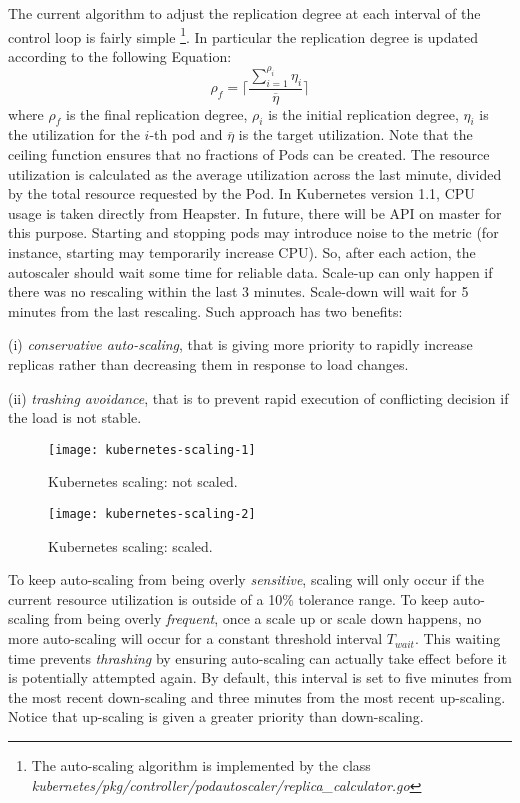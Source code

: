 The current algorithm to adjust the replication degree at each interval of the control loop is fairly simple
\footnote{The auto-scaling algorithm is implemented by the class \textit{kubernetes/pkg/controller/podautoscaler/replica\_calculator.go}}.
%
In particular the replication degree is updated according to the following Equation:
%
\begin{equation}
\label{eqn:kubernetes-auto-scaling}
\rho_{f} = \Biggl\lceil\frac{\sum_{i=1}^{\rho_{i}} \eta_{i}}{\overline{\eta}}\Biggr\rceil
\end{equation}
%
where
$\rho_{f}$ is the final replication degree,
$\rho_{i}$ is the initial replication degree,
$\eta_{i}$ is the utilization for the $i$-th pod and
$\overline{\eta}$ is the target utilization.
%
Note that the ceiling function ensures that no fractions of Pods can be created.
%
The resource utilization is calculated as the average utilization across the last minute, divided by the total resource requested by the Pod. 
%
In Kubernetes version 1.1, CPU usage is taken directly from Heapster. In future, there will be API on master for this purpose.
%
Starting and stopping pods may introduce noise to the metric (for instance, starting may temporarily increase CPU). So, after each action, the autoscaler should wait some time for reliable data. Scale-up can only happen if there was no rescaling within the last 3 minutes. Scale-down will wait for 5 minutes from the last rescaling.
%
Such approach has two benefits: 

(i) \textit{conservative auto-scaling}, that is giving more priority to rapidly increase replicas rather than decreasing them in response to load changes.

(ii) \textit{trashing avoidance}, that is to prevent rapid execution of conflicting decision if the load is not stable.

\begin{figure}	
	\label{fig:kubernetes-scaling-1}
	\centering
	\texttt{[image: kubernetes-scaling-1]}
	\caption{Kubernetes scaling: not scaled.}
\end{figure}

\begin{figure}	
	\label{fig:kubernetes-scaling-2}
	\centering
	\texttt{[image: kubernetes-scaling-2]}
	\caption{Kubernetes scaling: scaled.}
\end{figure}

To keep auto-scaling from being overly \textit{sensitive}, scaling will only occur if the current resource utilization is outside of a 10\% tolerance range.
%
To keep auto-scaling from being overly \textit{frequent}, once a scale up or scale down happens, no more auto-scaling will occur for a constant threshold interval $T_{wait}$.
%
This waiting time prevents \textit{thrashing} by ensuring auto-scaling can actually take effect before it is potentially attempted again.
%
By default, this interval is set to five minutes from the most recent down-scaling and three minutes from the most recent up-scaling. 
%
Notice that up-scaling is given a greater priority than down-scaling.

